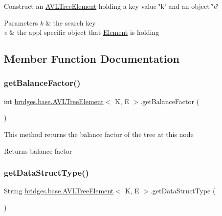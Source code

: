 Construct an \hyperlink{classbridges_1_1base_1_1_a_v_l_tree_element}{A\+V\+L\+Tree\+Element} holding a key value \char`\"{}k\char`\"{} and an object \char`\"{}e\char`\"{}


\begin{DoxyParams}{Parameters}
{\em k} & the search key \\
\hline
{\em e} & the appl specific object that \hyperlink{classbridges_1_1base_1_1_element}{Element} is holding \\
\hline
\end{DoxyParams}


\subsection{Member Function Documentation}
\hypertarget{classbridges_1_1base_1_1_a_v_l_tree_element_a0478ca0351cd714e8f7b8e49703990c8}{}\label{classbridges_1_1base_1_1_a_v_l_tree_element_a0478ca0351cd714e8f7b8e49703990c8} 
\subsubsection{\texorpdfstring{get\+Balance\+Factor()}{getBalanceFactor()}}
{\footnotesize\ttfamily int \hyperlink{classbridges_1_1base_1_1_a_v_l_tree_element}{bridges.\+base.\+A\+V\+L\+Tree\+Element}$<$ K, E $>$.get\+Balance\+Factor (\begin{DoxyParamCaption}{ }\end{DoxyParamCaption})}

This method returns the balance factor of the tree at this node

\begin{DoxyReturn}{Returns}
balance factor 
\end{DoxyReturn}
\hypertarget{classbridges_1_1base_1_1_a_v_l_tree_element_abdd9e63de10732ef46bd5d531bd7f9d8}{}\label{classbridges_1_1base_1_1_a_v_l_tree_element_abdd9e63de10732ef46bd5d531bd7f9d8} 
\subsubsection{\texorpdfstring{get\+Data\+Struct\+Type()}{getDataStructType()}}
{\footnotesize\ttfamily String \hyperlink{classbridges_1_1base_1_1_a_v_l_tree_element}{bridges.\+base.\+A\+V\+L\+Tree\+Element}$<$ K, E $>$.get\+Data\+Struct\+Type (\begin{DoxyParamCaption}{ }\end{DoxyParamCaption})}

